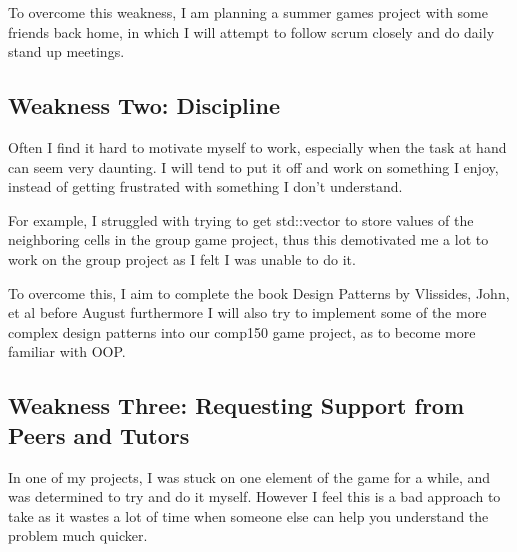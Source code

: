 \documentclass{scrartcl}
\begin{document}
{To overcome this weakness, I am planning a summer games project with some friends back home, in which I will attempt to follow scrum closely and do daily stand up meetings.

\subsection{Weakness Two: Discipline}

Often I find it hard to motivate myself to work, especially when the task at hand can seem very daunting. I will tend to put it off and work on something I enjoy, instead of getting frustrated with something I don't understand.


For example, I struggled with trying to get std::vector to store values of the neighboring cells in the group game project, thus this demotivated me a lot to work on the group project as I felt I was unable to do it. 

 
To overcome this, I aim to complete the book Design Patterns by Vlissides, John, et al before August furthermore I will also try to implement some of the more complex design patterns into our comp150 game project, as to become more familiar with OOP.

\subsection{Weakness Three: Requesting Support from Peers and Tutors}


In one of my projects, I was stuck on one element of the game for a while, and was determined to try and do it myself. However I feel this is a bad approach to take as it wastes a lot of time when someone else can help you understand the problem much quicker.

}
\end{document}
